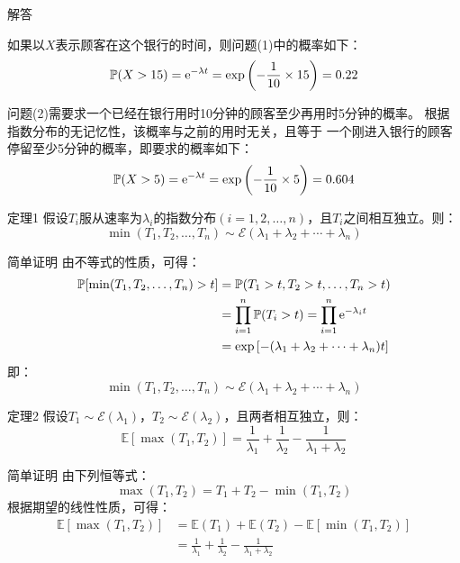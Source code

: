 \documentclass[t]{beamer}
\renewcommand{\Pr}{\mathbb{P}}
\newcommand{\E}{\mathbb{E}}
\begin{document}
\begin{frame}{解答}
    
如果以$X$表示顾客在这个银行的时间，则问题(1)中的概率如下：
\[\Pr(X> 15)={\rm e}^{-\lambda t}=\exp\qty(-\frac{1}{10}\times 15)=0.22 \]

问题(2)需要求一个已经在银行用时10分钟的顾客至少再用时5分钟的概率。
根据指数分布的无记忆性，该概率与之前的用时无关，且等于
一个刚进入银行的顾客停留至少5分钟的概率，即要求的概率如下：
\[\Pr(X> 5)={\rm e}^{-\lambda t}=\exp\qty(-\frac{1}{10}\times 5)=0.604 \]
\end{frame}



\begin{frame}{定理1}\small
    假设$T_i$服从速率为$\lambda_i$的指数分布$(i=1,2,\ldots,n)$，且$T_i$之间相互独立。则：
\begin{equation*}
	\min(T_1,T_2,\ldots,T_n)\sim \mathcal{E}(\lambda_1+\lambda_2+\cdots+\lambda_n)
\end{equation*}
\begin{block}{简单证明}
    由不等式的性质，可得：	
	\[\begin{split}
	{\Pr[\min(T_1,T_2,\ldots,T_n)>t]}&=\Pr(T_1>t,T_2>t,\ldots, T_n>t)\\
	&=\prod_{i=1}^{n}\Pr(T_i>t)=\prod_{i=1}^{n}{\rm e}^{-\lambda_i t}\\
	&={\exp\left[-(\lambda_1+\lambda_2+\cdots+\lambda_n)t \right]}
	\end{split}
	\]
	即：$$\min(T_1,T_2,\ldots,T_n)\sim \mathcal{E}(\lambda_1+\lambda_2+\cdots+\lambda_n)$$
\end{block}

\end{frame}


\begin{frame}{定理2}\small
    假设$T_1\sim \mathcal{E}(\lambda_1)$，$T_2\sim \mathcal{E}(\lambda_2)$，且两者相互独立，则：
\begin{equation*}
\E\left[\max(T_1,T_2) \right]=\frac{1}{\lambda_1}+\frac{1}{\lambda_2}-\frac{1}{\lambda_1+\lambda_2}
\end{equation*}
\begin{block}{简单证明}
由下列恒等式：
	$$\max(T_1,T_2)=T_1+T_2-\min(T_1,T_2)$$
	根据期望的线性性质，可得：
	\[\begin{split}
	\E[\max(T_1,T_2)]&=\E( T_1)+\E( T_2)-\E[\min(T_1,T_2)]\\
	&=\frac{1}{\lambda_1}+\frac{1}{\lambda_2}-\frac{1}{\lambda_1+\lambda_2}
	\end{split} \]
\end{block}
\end{frame}
\end{document}
